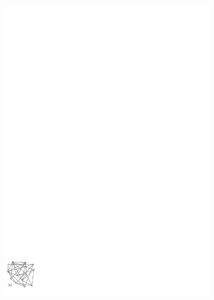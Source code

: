 \documentclass[a4paper,english,numberwithinsect]{eurocg18}
\begin{document}
\begin{figure}
	\centering
	\includegraphics{export_full}
	\hfill

\end{figure}
\end{document}
